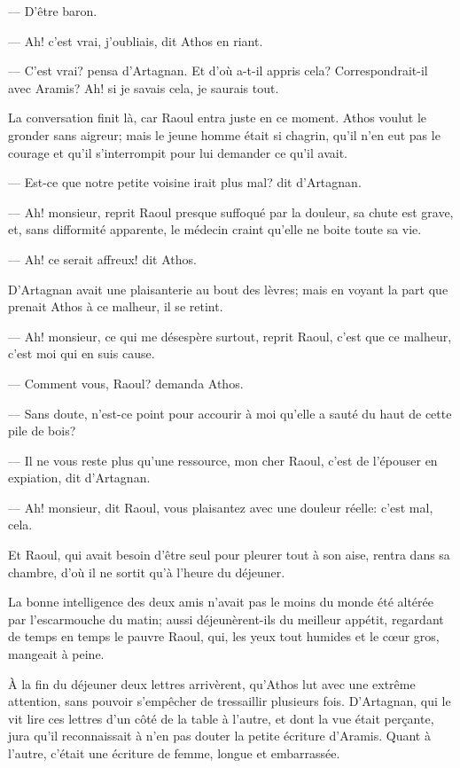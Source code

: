 — D'être baron.

— Ah! c'est vrai, j'oubliais, dit Athos en riant.

— C'est vrai? pensa d'Artagnan. Et d'où a-t-il appris cela? Correspondrait-il avec Aramis? Ah! si je savais cela, je saurais tout.

La conversation finit là, car Raoul entra juste en ce moment. Athos voulut le gronder sans aigreur; mais le jeune homme était si chagrin, qu'il n'en eut pas le courage et qu'il s'interrompit pour lui demander ce qu'il avait.

— Est-ce que notre petite voisine irait plus mal? dit d'Artagnan.

— Ah! monsieur, reprit Raoul presque suffoqué par la douleur, sa chute est grave, et, sans difformité apparente, le médecin craint qu'elle ne boite toute sa vie.

— Ah! ce serait affreux! dit Athos.

D'Artagnan avait une plaisanterie au bout des lèvres; mais en voyant la part que prenait Athos à ce malheur, il se retint.

— Ah! monsieur, ce qui me désespère surtout, reprit Raoul, c'est que ce malheur, c'est moi qui en suis cause.

— Comment vous, Raoul? demanda Athos.

— Sans doute, n'est-ce point pour accourir à moi qu'elle a sauté du haut de cette pile de bois?

— Il ne vous reste plus qu'une ressource, mon cher Raoul, c'est de l'épouser en expiation, dit d'Artagnan.

— Ah! monsieur, dit Raoul, vous plaisantez avec une douleur réelle: c'est mal, cela.

Et Raoul, qui avait besoin d'être seul pour pleurer tout à son aise, rentra dans sa chambre, d'où il ne sortit qu'à l'heure du déjeuner.

La bonne intelligence des deux amis n'avait pas le moins du monde été altérée par l'escarmouche du matin; aussi déjeunèrent-ils du meilleur appétit, regardant de temps en temps le pauvre Raoul, qui, les yeux tout humides et le cœur gros, mangeait à peine.

À la fin du déjeuner deux lettres arrivèrent, qu'Athos lut avec une extrême attention, sans pouvoir s'empêcher de tressaillir plusieurs fois. D'Artagnan, qui le vit lire ces lettres d'un côté de la table à l'autre, et dont la vue était perçante, jura qu'il reconnaissait à n'en pas douter la petite écriture d'Aramis. Quant à l'autre, c'était une écriture de femme, longue et embarrassée.

